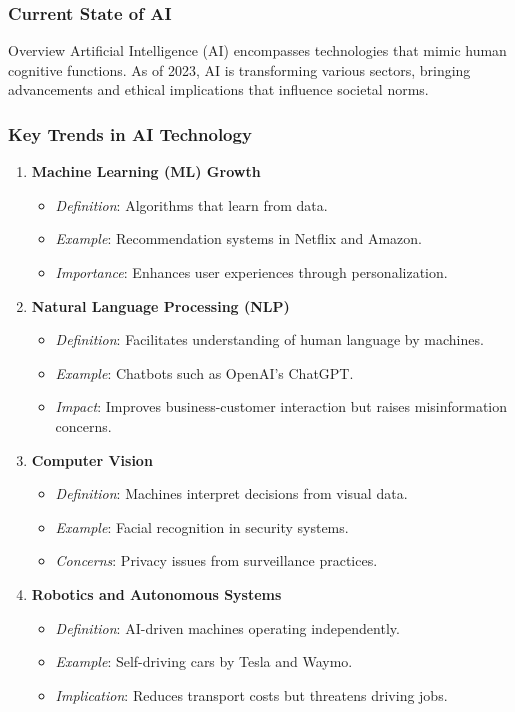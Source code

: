 \documentclass[aspectratio=169]{beamer}
\begin{document}
\begin{frame}[fragile]
    \frametitle{Current State of AI}
    \begin{block}{Overview}
        Artificial Intelligence (AI) encompasses technologies that mimic human cognitive functions. As of 2023, AI is transforming various sectors, bringing advancements and ethical implications that influence societal norms.
    \end{block}
\end{frame}

\begin{frame}[fragile]
    \frametitle{Key Trends in AI Technology}
    \begin{enumerate}
        \item \textbf{Machine Learning (ML) Growth}
            \begin{itemize}
                \item \textit{Definition}: Algorithms that learn from data.
                \item \textit{Example}: Recommendation systems in Netflix and Amazon.
                \item \textit{Importance}: Enhances user experiences through personalization.
            \end{itemize}
        \item \textbf{Natural Language Processing (NLP)}
            \begin{itemize}
                \item \textit{Definition}: Facilitates understanding of human language by machines.
                \item \textit{Example}: Chatbots such as OpenAI's ChatGPT.
                \item \textit{Impact}: Improves business-customer interaction but raises misinformation concerns.
            \end{itemize}
        \item \textbf{Computer Vision}
            \begin{itemize}
                \item \textit{Definition}: Machines interpret decisions from visual data.
                \item \textit{Example}: Facial recognition in security systems.
                \item \textit{Concerns}: Privacy issues from surveillance practices.
            \end{itemize}
        \item \textbf{Robotics and Autonomous Systems}
            \begin{itemize}
                \item \textit{Definition}: AI-driven machines operating independently.
                \item \textit{Example}: Self-driving cars by Tesla and Waymo.
                \item \textit{Implication}: Reduces transport costs but threatens driving jobs.
            \end{itemize}
    \end{enumerate}
\end{frame}
\end{document}

